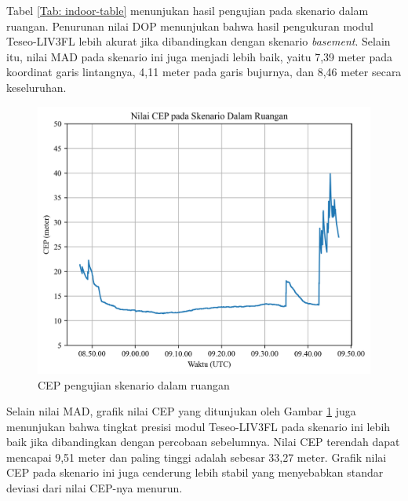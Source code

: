 Tabel \ref{Tab: indoor-table} menunjukan hasil pengujian pada skenario dalam ruangan. Penurunan nilai DOP menunjukan bahwa hasil pengukuran modul Teseo\hyp{}LIV3FL lebih akurat jika dibandingkan dengan skenario \textit{basement}. Selain itu, nilai MAD pada skenario ini juga menjadi lebih baik, yaitu 7,39 meter pada koordinat garis lintangnya, 4,11 meter pada garis bujurnya, dan 8,46 meter secara keseluruhan.

\begin{figure}[H]
	\centering
	\includegraphics[width=13cm]{contents/chapter-4/2-skenario-indoor/cep.png}
	\caption{CEP pengujian skenario dalam ruangan}
	\label{Fig: indoor-cep}
\end{figure}

Selain nilai MAD, grafik nilai CEP yang ditunjukan oleh Gambar \ref{Fig: indoor-cep} juga menunjukan bahwa tingkat presisi modul Teseo\hyp{}LIV3FL pada skenario ini lebih baik jika dibandingkan dengan percobaan sebelumnya. Nilai CEP terendah dapat mencapai 9,51 meter dan paling tinggi adalah sebesar 33,27 meter. Grafik nilai CEP pada skenario ini juga cenderung lebih stabil yang menyebabkan standar deviasi dari nilai CEP-nya menurun. 

